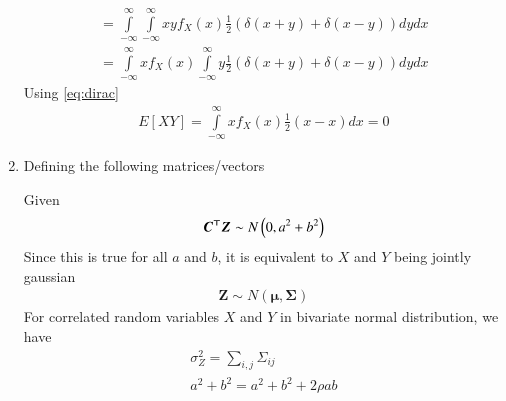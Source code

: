 \documentclass[journal,12pt,twocolumn]{IEEEtran}
\begin{document}
\begin{enumerate}
\begin{align}
=\int\limits_{-\infty}^{\infty}\int\limits_{-\infty}^{\infty}xyf_X(x)\frac{1}{2}(\delta(x+y)+\delta(x-y)) dy dx\\
=\int\limits_{-\infty}^{\infty} xf_X(x)\int\limits_{-\infty}^{\infty}y\frac{1}{2}(\delta(x+y)+\delta(x-y)) dy dx
\end{align}
Using \eqref{eq:dirac}
\begin{align}
E[XY]=\int\limits_{-\infty}^{\infty}xf_X(x)\frac{1}{2}(x-x)dx=0
\end{align}
\item
Defining the following matrices/vectors
\begin{table}[htp]
\centering
\caption{vectors/matrices and their expressions}
\label{table1}
\end{table}
Given
\begin{align}
\boldsymbol{C^\top Z}\sim N\left(0,a^2+b^2\right)
\end{align}
Since this is true for all $a$ and $b$, it is equivalent to $X$ and $Y$ being jointly gaussian
\begin{align}
\boldsymbol{Z}\sim N(\boldsymbol{\mu},\boldsymbol{\Sigma})
\end{align}
For correlated random variables $X$ and $Y$ in bivariate normal distribution, we have
\begin{align}
\sigma_{Z}^2=\displaystyle\sum_{i,j}\Sigma_{ij}\\
a^2+b^2=a^2+b^2+2\rho ab\\

\end{align}
\end{enumerate}
\end{document}
